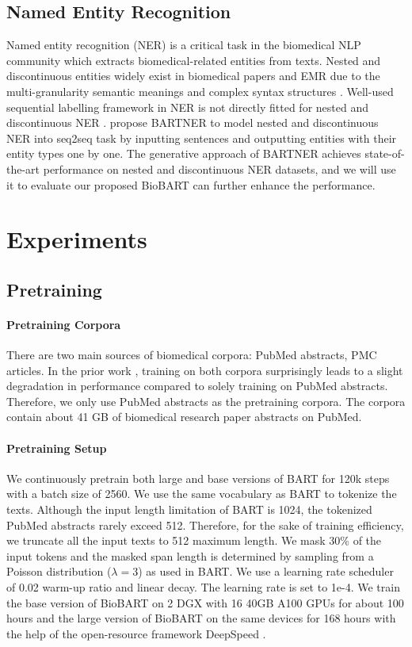 \documentclass[11pt]{article}
\begin{document}
\subsection{Named Entity Recognition}
Named entity recognition (NER) is a critical task in the biomedical NLP community which extracts biomedical-related entities from texts.
Nested and discontinuous entities widely exist in biomedical papers and EMR due to the multi-granularity semantic meanings and complex syntax structures \cite{yuan2020unsupervised}.
Well-used sequential labelling framework in NER \cite{lample2016neural} is not directly fitted for nested and discontinuous NER \cite{finkel2009nested}.
\citet{bartner} propose BARTNER to model nested and discontinuous NER into seq2seq task by inputting sentences and outputting entities with their entity types one by one.
The generative approach of BARTNER achieves state-of-the-art performance on nested and discontinuous NER datasets, and we will use it to evaluate our proposed BioBART can further enhance the performance.

\section{Experiments}

\subsection{Pretraining}
\paragraph{Pretraining Corpora}

There are two main sources of biomedical corpora: PubMed abstracts, PMC articles. In the prior work \cite{pubmedbert}, training on both corpora surprisingly leads to a slight degradation in performance compared to solely training on PubMed abstracts. 
Therefore, we only use PubMed abstracts as the pretraining corpora. 
The corpora contain about 41 GB of biomedical research paper abstracts on PubMed.

\paragraph{Pretraining Setup}

We continuously pretrain both large and base versions of BART for 120k steps with a batch size of 2560. We use the same vocabulary as BART to tokenize the texts. Although the input length limitation of BART is 1024, the tokenized PubMed abstracts rarely exceed 512. Therefore, for the sake of training efficiency, we truncate all the input texts to 512 maximum length. We mask 30\% of the input tokens and the masked span length is determined by sampling from a Poisson distribution ($\lambda=3$) as used in BART. We use a learning rate scheduler of 0.02 warm-up ratio and linear decay. The learning rate is set to 1e-4. We train the base version of BioBART on 2 DGX with 16 40GB A100 GPUs for about 100 hours and the large version of BioBART on the same devices for 168 hours with the help of the open-resource framework DeepSpeed \cite{deepspeed}. 
\end{document}

